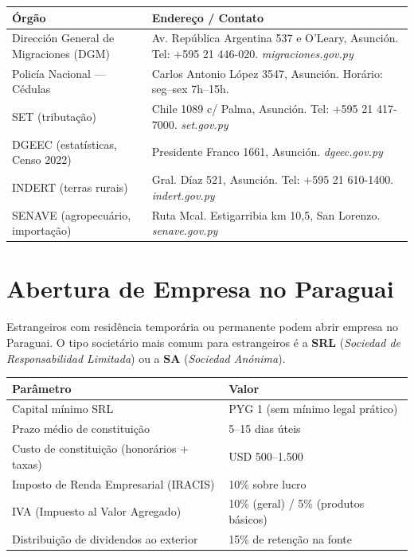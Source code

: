 \begin{tabularx}{\linewidth}{lX}
\toprule
\textbf{Órgão} & \textbf{Endereço / Contato} \\
\midrule
Dirección General de Migraciones (DGM) & Av. República Argentina 537 e O'Leary, Asunción. Tel: +595 21 446-020. \textit{migraciones.gov.py} \\
Policía Nacional --- Cédulas & Carlos Antonio López 3547, Asunción. Horário: seg--sex 7h--15h. \\
SET (tributação) & Chile 1089 c/ Palma, Asunción. Tel: +595 21 417-7000. \textit{set.gov.py} \\
DGEEC (estatísticas, Censo 2022) & Presidente Franco 1661, Asunción. \textit{dgeec.gov.py} \\
INDERT (terras rurais) & Gral. Díaz 521, Asunción. Tel: +595 21 610-1400. \textit{indert.gov.py} \\
SENAVE (agropecuário, importação) & Ruta Mcal. Estigarribia km 10,5, San Lorenzo. \textit{senave.gov.py} \\
\bottomrule
\end{tabularx}

\section*{Abertura de Empresa no Paraguai}

Estrangeiros com residência temporária ou permanente podem abrir empresa no Paraguai. O tipo societário mais comum para estrangeiros é a \textbf{SRL} (\textit{Sociedad de Responsabilidad Limitada}) ou a \textbf{SA} (\textit{Sociedad Anónima}).

\begin{tabularx}{\linewidth}{lX}
\toprule
\textbf{Parâmetro} & \textbf{Valor} \\
\midrule
Capital mínimo SRL & PYG 1 (sem mínimo legal prático) \\
Prazo médio de constituição & 5--15 dias úteis \\
Custo de constituição (honorários + taxas) & USD 500--1.500 \\
Imposto de Renda Empresarial (IRACIS) & 10\% sobre lucro \\
IVA (Impuesto al Valor Agregado) & 10\% (geral) / 5\% (produtos básicos) \\
Distribuição de dividendos ao exterior & 15\% de retenção na fonte \\
\bottomrule
\end{tabularx}

